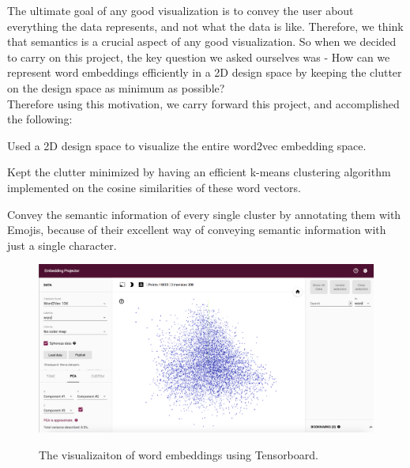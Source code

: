 The ultimate goal of any good visualization is to convey the user about everything the data represents, and not what the data is like. Therefore, we think that semantics is a crucial aspect of any good visualization. So when we decided to carry on this project, the key question we asked ourselves was - How can we represent word embeddings efficiently in a 2D design space by keeping the clutter on the design space as minimum as possible? \\

Therefore using this motivation, we carry forward this project, and accomplished the following:
\begin{itemize*}
 \item Used a 2D design space to visualize the entire word2vec embedding space.
 \item Kept the clutter minimized by having an efficient k-means clustering algorithm implemented on the cosine similarities of these word vectors.
 \item Convey the semantic information of every single cluster by annotating them with Emojis, because of their excellent way of conveying semantic information with just a single character.
\end{itemize*}

\begin{figure}[htb]
 \centering
     {\includegraphics[width=0.78\linewidth]{figures/tensorboard.png}}
    \vspace{-1ex}
     \caption{The visualizaiton of word embeddings using Tensorboard.}
\label{fig:tensorboard}
\end{figure}


